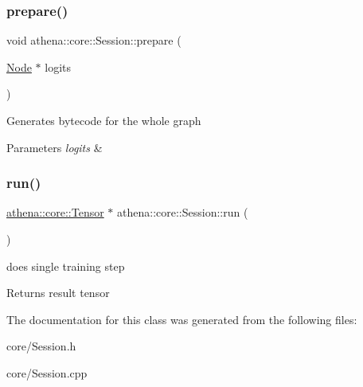 \subsubsection{\texorpdfstring{prepare()}{prepare()}}
{\footnotesize\ttfamily void athena\+::core\+::\+Session\+::prepare (\begin{DoxyParamCaption}\item[{\mbox{\hyperlink{classathena_1_1core_1_1_node}{Node}} $\ast$}]{logits }\end{DoxyParamCaption})}

Generates bytecode for the whole graph 
\begin{DoxyParams}{Parameters}
{\em logits} & \\
\hline
\end{DoxyParams}
\mbox{\label{classathena_1_1core_1_1_session_ab08af50ae0bbd2ed5171e1f45a7680ff}} 
\subsubsection{\texorpdfstring{run()}{run()}}
{\footnotesize\ttfamily \mbox{\hyperlink{classathena_1_1core_1_1_tensor}{athena\+::core\+::\+Tensor}} $\ast$ athena\+::core\+::\+Session\+::run (\begin{DoxyParamCaption}{ }\end{DoxyParamCaption})}

does single training step \begin{DoxyReturn}{Returns}
result tensor 
\end{DoxyReturn}


The documentation for this class was generated from the following files\+:\begin{DoxyCompactItemize}
\item 
core/Session.\+h\item 
core/Session.\+cpp\end{DoxyCompactItemize}
